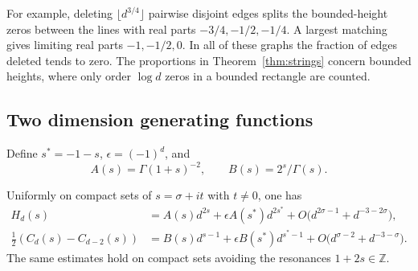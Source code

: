 For example, deleting $\lfloor d^{3/4}\rfloor$ pairwise disjoint edges
splits the bounded-height zeros between the lines with real parts
$-3/4,-1/2,-1/4$. A largest matching gives limiting real parts $-1,-1/2,0$.
In all of these graphs the fraction of edges deleted tends to zero.
The proportions in Theorem~\ref{thm:strings} concern bounded heights,
where only order $\log d$ zeros in a bounded rectangle are counted.

\subsection{Two dimension generating functions}
Define $s^*=-1-s$, $\epsilon=(-1)^d$, and
\[
 A(s)=\Gamma(1+s)^{-2},\qquad B(s)=2^s/\Gamma(s).
\]
\begin{lemma}\label{lem:expansion}
Uniformly on compact sets of $s=\sigma+it$ with $t\ne0$, one has
\begin{align}
 H_d(s)&=A(s)d^{2s}+\epsilon A(s^*)d^{2s^*}
       +O\big(d^{2\sigma-1}+d^{-3-2\sigma}\big),\label{eq:Hexp}\\
 \tfrac12(C_d(s)-C_{d-2}(s))
   &=B(s)d^{s-1}+\epsilon B(s^*)d^{s^*-1}
       +O\big(d^{\sigma-2}+d^{-3-\sigma}\big).\label{eq:Cexp}
\end{align}
The same estimates hold on compact sets avoiding the resonances
$1+2s\in\mathbb Z$.
\end{lemma}
